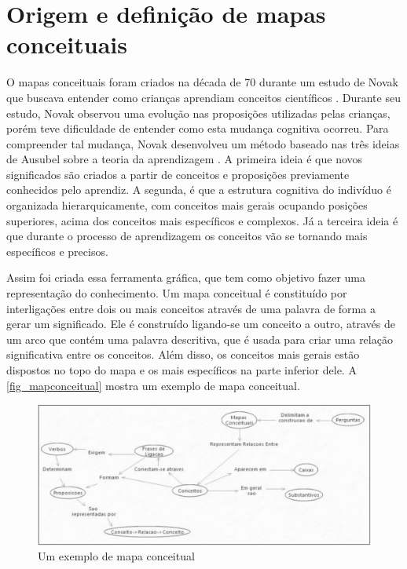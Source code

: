 \documentclass[
	12pt,				%
	openright,			%
	oneside,			%
	a4paper,			%
	english,			%
	french,				%
	spanish,			%
	brazil				%
	]{abntex2}
\begin{document}
\section{Origem e definição de mapas conceituais}
O mapas conceituais foram criados na década de 70 durante um estudo de Novak que buscava entender como crianças aprendiam conceitos científicos \cite{Novak2005}. Durante seu estudo, Novak observou uma evolução nas proposições utilizadas pelas crianças, porém teve dificuldade de entender como esta mudança cognitiva ocorreu. Para compreender tal mudança, Novak desenvolveu um método baseado nas três ideias de Ausubel sobre a teoria da aprendizagem \cite{ausubel1963}. A primeira ideia é que novos significados são criados a partir de conceitos e proposições previamente conhecidos pelo aprendiz. A segunda, é que a estrutura cognitiva do indivíduo é organizada hierarquicamente, com conceitos mais gerais ocupando posições superiores, acima dos conceitos mais específicos e complexos. Já a terceira ideia é que durante o processo de aprendizagem os conceitos vão se tornando mais específicos e precisos.

Assim foi criada essa ferramenta gráfica, que tem como objetivo fazer uma representação do conhecimento. Um mapa conceitual é constituído por interligações entre dois ou mais conceitos através de uma palavra de forma a gerar um significado. Ele é construído ligando-se um conceito a outro, através de um arco que contém uma palavra descritiva, que é usada para criar uma relação significativa entre os conceitos. Além disso, os conceitos mais gerais estão dispostos no topo do mapa e os mais específicos na parte inferior dele. A \autoref{fig_mapconceitual} mostra um exemplo de mapa conceitual.
\begin{figure}[htb]
	\caption{\label{fig_mapconceitual}Um exemplo de mapa conceitual}
	\begin{center}
		\includegraphics[scale=0.3]{mapaconceitual.png}
	\end{center}
\end{figure}
\end{document}
